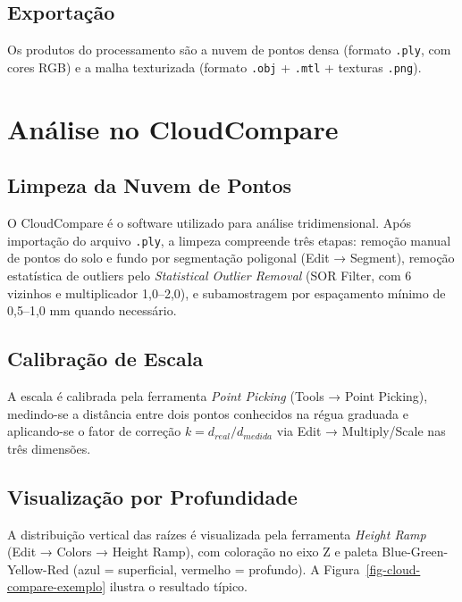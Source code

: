 \documentclass[
  portuguese,
  11pt,
  a4paper,
  open=any]{scrbook}
\begin{document}
\subsection{Exportação}\label{exportauxe7uxe3o}

Os produtos do processamento são a nuvem de pontos densa (formato
\texttt{.ply}, com cores RGB) e a malha texturizada (formato
\texttt{.obj} + \texttt{.mtl} + texturas \texttt{.png}).

\section{Análise no CloudCompare}\label{anuxe1lise-no-cloudcompare}

\subsection{Limpeza da Nuvem de
Pontos}\label{limpeza-da-nuvem-de-pontos}

O CloudCompare é o software utilizado para análise tridimensional. Após
importação do arquivo \texttt{.ply}, a limpeza compreende três etapas:
remoção manual de pontos do solo e fundo por segmentação poligonal (Edit
→ Segment), remoção estatística de outliers pelo \emph{Statistical
Outlier Removal} (SOR Filter, com 6 vizinhos e multiplicador 1,0--2,0),
e subamostragem por espaçamento mínimo de 0,5--1,0 mm quando necessário.

\subsection{Calibração de Escala}\label{calibrauxe7uxe3o-de-escala}

A escala é calibrada pela ferramenta \emph{Point Picking} (Tools → Point
Picking), medindo-se a distância entre dois pontos conhecidos na régua
graduada e aplicando-se o fator de correção \(k = d_{real}/d_{medida}\)
via Edit → Multiply/Scale nas três dimensões.

\subsection{Visualização por
Profundidade}\label{visualizauxe7uxe3o-por-profundidade}

A distribuição vertical das raízes é visualizada pela ferramenta
\emph{Height Ramp} (Edit → Colors → Height Ramp), com coloração no eixo
Z e paleta Blue-Green-Yellow-Red (azul = superficial, vermelho =
profundo). A Figura~\ref{fig-cloud-compare-exemplo} ilustra o resultado
típico.
\end{document}
